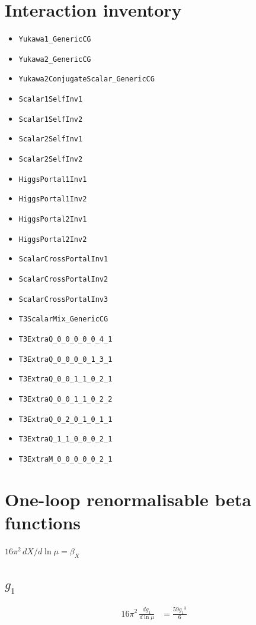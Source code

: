 \documentclass[10pt,a4paper]{article}
\begin{document}
\section*{Interaction inventory}
\begin{itemize}
\item \texttt{Yukawa1\_GenericCG}
\item \texttt{Yukawa2\_GenericCG}
\item \texttt{Yukawa2ConjugateScalar\_GenericCG}
\item \texttt{Scalar1SelfInv1}
\item \texttt{Scalar1SelfInv2}
\item \texttt{Scalar2SelfInv1}
\item \texttt{Scalar2SelfInv2}
\item \texttt{HiggsPortal1Inv1}
\item \texttt{HiggsPortal1Inv2}
\item \texttt{HiggsPortal2Inv1}
\item \texttt{HiggsPortal2Inv2}
\item \texttt{ScalarCrossPortalInv1}
\item \texttt{ScalarCrossPortalInv2}
\item \texttt{ScalarCrossPortalInv3}
\item \texttt{T3ScalarMix\_GenericCG}
\item \texttt{T3ExtraQ\_0\_0\_0\_0\_0\_4\_1}
\item \texttt{T3ExtraQ\_0\_0\_0\_0\_1\_3\_1}
\item \texttt{T3ExtraQ\_0\_0\_1\_1\_0\_2\_1}
\item \texttt{T3ExtraQ\_0\_0\_1\_1\_0\_2\_2}
\item \texttt{T3ExtraQ\_0\_2\_0\_1\_0\_1\_1}
\item \texttt{T3ExtraQ\_1\_1\_0\_0\_0\_2\_1}
\item \texttt{T3ExtraM\_0\_0\_0\_0\_0\_2\_1}
\end{itemize}
\clearpage
\section*{One-loop renormalisable beta functions}
$16\pi^2\,dX/d\ln\mu=\beta_X$
\subsection*{$g_1$}
\begin{align*}
16\pi^2\,\frac{d g_1}{d\ln\mu} &=\frac{59 {g_1}^3}{6} \\
\end{align*}
\end{document}
